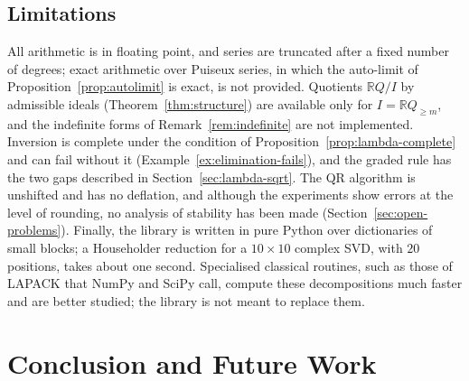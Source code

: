 \documentclass[12pt, a4paper]{report}
\theoremstyle{plain}
\theoremstyle{definition}
\theoremstyle{remark}
\theoremstyle{plain}
\newcommand{\RR}{\mathbb{R}}
\begin{document}
\section{Limitations}
\label{sec:impl-limitations}
All arithmetic is in floating point, and series are truncated after a fixed number of degrees; exact arithmetic over Puiseux series, in which the auto-limit of Proposition~\ref{prop:autolimit} is exact, is not provided. Quotients $\RR Q/I$ by admissible ideals (Theorem~\ref{thm:structure}) are available only for $I=\RR Q_{\geq m}$, and the indefinite forms of Remark~\ref{rem:indefinite} are not implemented. Inversion is complete under the condition of Proposition~\ref{prop:lambda-complete} and can fail without it (Example~\ref{ex:elimination-fails}), and the graded rule has the two gaps described in Section~\ref{sec:lambda-sqrt}. The QR algorithm is unshifted and has no deflation, and although the experiments show errors at the level of rounding, no analysis of stability has been made (Section~\ref{sec:open-problems}). Finally, the library is written in pure Python over dictionaries of small blocks; a Householder reduction for a $10\times10$ complex SVD, with $20$ positions, takes about one second. Specialised classical routines, such as those of LAPACK that NumPy and SciPy call, compute these decompositions much faster and are better studied; the library is not meant to replace them.
\chapter{Conclusion and Future Work}
\label{chap:conclusion}
\end{document}
